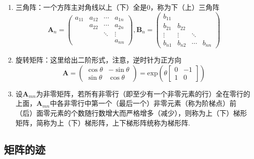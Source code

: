{\begin{enumerate}[label=（\arabic*）]
\[                  a_{11},a_{22},\cdots,a_{nn}
                  \right\}
              \]
        \item 三角阵：一个方阵主对角线以上（下）全是$ 0$，称为下（上）三角阵\[
                  \bm{A}_n = \begin{pmatrix}
                      a_{11} & a_{12} & \cdots & a_{1n} \\
                             & a_{22} & \cdots & a_{2n} \\
                             &        & \ddots & \vdots \\
                             &        &        & a_{nn}
                  \end{pmatrix}
                  ,
                  \bm{B}_n = \begin{pmatrix}
                      b_{11} &        &        &        \\
                      b_{21} & b_{22} &        &        \\
                      \vdots & \vdots & \ddots &        \\
                      b_{n1} & b_{n2} & \cdots & b_{nn}
                  \end{pmatrix}
              \]
        \item 旋转矩阵：这里给出二阶形式，注意，逆时针为正方向\[
                  \bm{A} = \begin{pmatrix}
                      \cos \theta & -\sin\theta \\
                      \sin\theta  & \cos\theta
                  \end{pmatrix}
                  = \mathrm{exp}\left(
                  \theta \begin{bmatrix}
                          0 & -1 \\
                          1 & 0
                      \end{bmatrix}
                  \right)
              \]
        \item 设$\bm{A}_{mn}$为非零矩阵，若所有非零行（即至少有一个非零元素的行）全在零行的上面，$\bm{A}_{mn}$中各非零行中第一个（最后一个）非零元素（称为阶梯点）前（后）面零元素的个数随行数增大而严格增多（减少），则称为上（下）梯形矩阵，简称为上（下）梯形阵，上下梯形阵统称为梯形阵.
    \end{enumerate}
}
\subsection{矩阵的迹}
